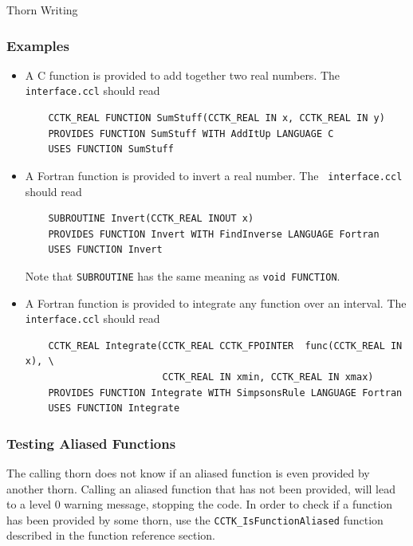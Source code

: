 \begin{cactuspart}{Thorn Writing}
\subsubsection{Examples}

\begin{itemize}
\item A C function is provided to add together two real numbers. The {\tt
    interface.ccl} should read
\begin{verbatim}
    CCTK_REAL FUNCTION SumStuff(CCTK_REAL IN x, CCTK_REAL IN y)
    PROVIDES FUNCTION SumStuff WITH AddItUp LANGUAGE C
    USES FUNCTION SumStuff
\end{verbatim}

\item A Fortran function is provided to invert a real number. The {\tt
    interface.ccl} should read
\begin{verbatim}
    SUBROUTINE Invert(CCTK_REAL INOUT x)
    PROVIDES FUNCTION Invert WITH FindInverse LANGUAGE Fortran
    USES FUNCTION Invert
\end{verbatim}
\noindent Note that \texttt{SUBROUTINE} has the same meaning as \texttt{void
  FUNCTION}.

\item A Fortran function is provided to integrate any function over
  an interval. The \texttt{interface.ccl} should read
\begin{verbatim}
    CCTK_REAL Integrate(CCTK_REAL CCTK_FPOINTER  func(CCTK_REAL IN x), \
                        CCTK_REAL IN xmin, CCTK_REAL IN xmax)
    PROVIDES FUNCTION Integrate WITH SimpsonsRule LANGUAGE Fortran
    USES FUNCTION Integrate
\end{verbatim}

\end{itemize}

\subsubsection{Testing Aliased Functions}

The calling thorn does not know if an aliased function is even
provided by another thorn. Calling an aliased function that has not
been provided, will lead to a level 0 warning message, stopping the
code. In order to check if a function has been provided by some thorn,
use the \texttt{CCTK\_IsFunctionAliased} function described in the
function reference section.



\end{cactuspart}

